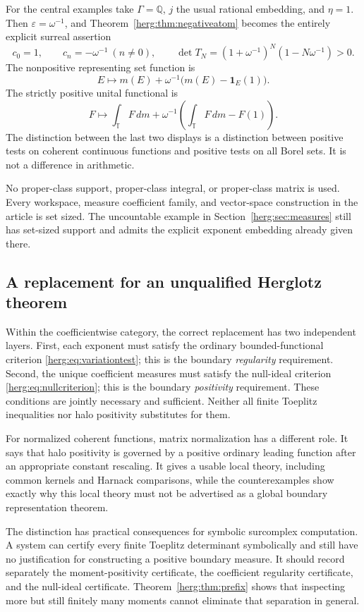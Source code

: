 \documentclass[11pt,letterpaper]{article}
\theoremstyle{definition}
\newcommand{\Q}{\mathbb Q}\newcommand{\T}{\mathbb T}
\newcommand{\eps}{\varepsilon}
\newcommand{\dd}{\,d}
\numberwithin{equation}{section}
\begin{document}
For the central examples take $\Gamma=\Q$, $j$ the usual rational embedding, and $\eta=1$. Then $\eps=\omega^{-1}$, and Theorem~\ref{herg:thm:negativeatom} becomes the entirely explicit surreal assertion
\[
 c_0=1,\qquad c_n=-\omega^{-1}\ (n\ne0),\qquad
 \det T_N=(1+\omega^{-1})^N(1-N\omega^{-1})>0.
\]
The nonpositive representing set function is
\[
 E\longmapsto m(E)+\omega^{-1}\bigl(m(E)-\mathbf1_E(1)\bigr).
\]
The strictly positive unital functional is
\[
 F\longmapsto\int_\T F\dd m+
 \omega^{-1}\left(\int_\T F\dd m-F(1)\right).
\]
The distinction between the last two displays is a distinction between positive tests on coherent continuous functions and positive tests on all Borel sets. It is not a difference in arithmetic.

No proper-class support, proper-class integral, or proper-class matrix is used. Every workspace, measure coefficient family, and vector-space construction in the article is set sized. The uncountable example in Section~\ref{herg:sec:measures} still has set-sized support and admits the explicit exponent embedding already given there.

\subsection{A replacement for an unqualified Herglotz theorem}

Within the coefficientwise category, the correct replacement has two independent layers. First, each exponent must satisfy the ordinary bounded-functional criterion \eqref{herg:eq:variationtest}; this is the boundary \emph{regularity} requirement. Second, the unique coefficient measures must satisfy the null-ideal criterion \eqref{herg:eq:nullcriterion}; this is the boundary \emph{positivity} requirement. These conditions are jointly necessary and sufficient. Neither all finite Toeplitz inequalities nor halo positivity substitutes for them.

For normalized coherent functions, matrix normalization has a different role. It says that halo positivity is governed by a positive ordinary leading function after an appropriate constant rescaling. It gives a usable local theory, including common kernels and Harnack comparisons, while the counterexamples show exactly why this local theory must not be advertised as a global boundary representation theorem.

The distinction has practical consequences for symbolic surcomplex computation. A system can certify every finite Toeplitz determinant symbolically and still have no justification for constructing a positive boundary measure. It should record separately the moment-positivity certificate, the coefficient regularity certificate, and the null-ideal certificate. Theorem~\ref{herg:thm:prefix} shows that inspecting more but still finitely many moments cannot eliminate that separation in general.
\end{document}
